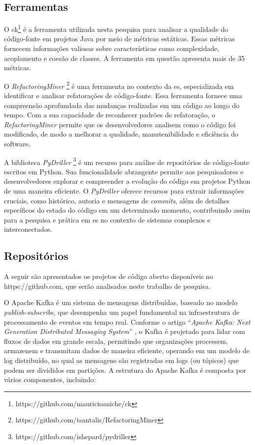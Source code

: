 \subsection{Ferramentas}\label{sec:ferramentas}
O \gls{ck}\footnote{https://github.com/mauricioaniche/ck} \cite{aniche-ck} é a ferramenta utilizada nesta pesquisa para analisar a qualidade do código-fonte em projetos Java \cite{JavaProgrammingLanguage} por meio de métricas estáticas. Essas métricas fornecem informações valiosas sobre características como complexidade, acoplamento e coesão de classes. A ferramenta em questão apresenta mais de 35 métricas.

O \textit{RefactoringMiner} \footnote{https://github.com/tsantalis/RefactoringMiner} \cite{Tsantalis:ICSE:2018:RefactoringMiner} é uma ferramenta no contexto da \gls{es}, especializada em identificar e analisar refatorações de código-fonte. Essa ferramenta fornece uma compreensão aprofundada das mudanças realizadas em um código ao longo do tempo. Com a sua capacidade de reconhecer padrões de refatoração, o \textit{RefactoringMiner} permite que os desenvolvedores analisem como o código foi modificado, de modo a melhorar a qualidade, manutenibilidade e eficiência do software.

A biblioteca \textit{PyDriller} \footnote{https://github.com/ishepard/pydriller}\cite{PyDrillerSpadini2018} é um recurso para análise de repositórios de código-fonte escritos em Python. Sua funcionalidade abrangente permite aos pesquisadores e desenvolvedores explorar e compreender a evolução do código em projetos Python de uma maneira eficiente. O \textit{PyDriller} oferece recursos para extrair informações cruciais, como histórico, autoria e mensagens de \textit{commits}, além de detalhes específicos do estado do código em um determinado momento, contribuindo assim para a pesquisa e prática em \gls{es} no contexto de sistemas complexos e interconectados.

\subsection{Repositórios}\label{sec:repositorios}
A seguir são apresentados os projetos de código aberto disponíveis no https://github.com, que serão analisados neste trabalho de pesquisa.

O Apache Kafka \cite{KafkaGitHub} é um sistema de mensagens distribuídas, baseado no modelo \textit{publish-subscribe}, que desempenha um papel fundamental na infraestrutura de processamento de eventos em tempo real. Conforme o artigo ``\textit{Apache Kafka: Next Generation Distributed Messaging System}'' \cite{ApacheKafkaNextGenerationDistributedMessagingSystem:2010}, o Kafka é projetado para lidar com fluxos de dados em grande escala, permitindo que organizações processem, armazenem e transmitam dados de maneira eficiente, operando em um modelo de log distribuído, no qual as mensagens são registradas em logs (ou tópicos) que podem ser divididos em partições. 
A estrutura do Apache Kafka é composta por vários componentes, incluindo:

